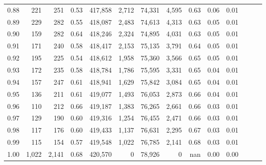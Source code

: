 \begin{tabular}{rrrrrrrrrrrrrr}
0.88 &     221 &    251 &  0.53 &  417,858 &    2,712 &  74,331 &   4,595 &  0.63 &  0.06 &      0.01 \\
0.89 &     229 &    282 &  0.55 &  418,087 &    2,483 &  74,613 &   4,313 &  0.63 &  0.05 &      0.01 \\
0.90 &     159 &    282 &  0.64 &  418,246 &    2,324 &  74,895 &   4,031 &  0.63 &  0.05 &      0.01 \\
0.91 &     171 &    240 &  0.58 &  418,417 &    2,153 &  75,135 &   3,791 &  0.64 &  0.05 &      0.01 \\
0.92 &     195 &    225 &  0.54 &  418,612 &    1,958 &  75,360 &   3,566 &  0.65 &  0.05 &      0.01 \\
0.93 &     172 &    235 &  0.58 &  418,784 &    1,786 &  75,595 &   3,331 &  0.65 &  0.04 &      0.01 \\
0.94 &     157 &    247 &  0.61 &  418,941 &    1,629 &  75,842 &   3,084 &  0.65 &  0.04 &      0.01 \\
0.95 &     136 &    211 &  0.61 &  419,077 &    1,493 &  76,053 &   2,873 &  0.66 &  0.04 &      0.01 \\
0.96 &     110 &    212 &  0.66 &  419,187 &    1,383 &  76,265 &   2,661 &  0.66 &  0.03 &      0.01 \\
0.97 &     129 &    190 &  0.60 &  419,316 &    1,254 &  76,455 &   2,471 &  0.66 &  0.03 &      0.01 \\
0.98 &     117 &    176 &  0.60 &  419,433 &    1,137 &  76,631 &   2,295 &  0.67 &  0.03 &      0.01 \\
0.99 &     115 &    154 &  0.57 &  419,548 &    1,022 &  76,785 &   2,141 &  0.68 &  0.03 &      0.01 \\
1.00 &   1,022 &  2,141 &  0.68 &  420,570 &        0 &  78,926 &       0 &   nan &  0.00 &      0.00 \\
\bottomrule
\end{tabular}
